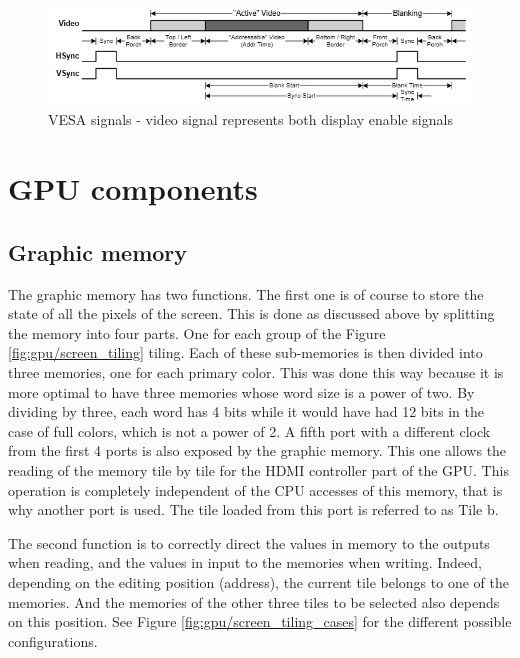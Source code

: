 \begin{figure}[H]
    \centering
    \includegraphics[width=\linewidth]{Chapter4-GPU_CLKU/res/vesa_signals.PNG}
    \caption{VESA signals - video signal represents both display enable signals}
    \label{fig:gpu/vesa_signals}
\end{figure}

\section{GPU components}

\subsection{Graphic memory}

The graphic memory has two functions. The first one is of course to store the state of all the 
pixels of the screen. This is done as discussed above by splitting the memory into four parts. One 
for each group of the Figure \ref{fig:gpu/screen_tiling} tiling. Each of these sub-memories is then 
divided into three memories, one for 
each primary color. This was done this way because it is more optimal to have three memories whose 
word size is a power of two. By dividing by three, each word has 4 bits while it would have had 
12 bits in the case of full colors, which is not a power of 2. A fifth port with a different clock 
from the first 4 ports is also exposed by the graphic memory. This one allows the reading of the 
memory tile by tile for the HDMI controller part of the GPU. This operation is completely independent
of the CPU accesses of this memory, that is why another port is used. The tile loaded from this port
is referred to as Tile b.

The second function is to correctly direct the values in memory to the outputs when reading, and 
the values in input to the memories when writing. Indeed, depending on the editing position (address), the 
current tile belongs to one of the memories. And the memories of the other three tiles to be 
selected also depends on this position. See Figure \ref{fig:gpu/screen_tiling_cases} for the different 
possible configurations. 

